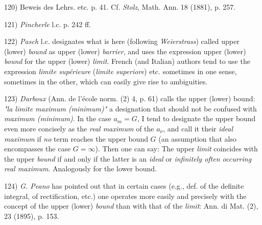 \vfill
\leftline{\rule{2in}{0.4pt}}
\vspace{0.2cm}
{
\footnotesize
120) Beweis des Lehrs. etc. p. 41. Cf. \textit{Stolz}, Math. Ann. 18 (1881), p. 257.

121) \textit{Pincherle} l.c. p. 242 ff.

122) \textit{Pasch} l.c. designates what is here (following \textit{Weierstrass}) called upper (lower) \textit{bound} as upper (lower) \textit{barrier}, and uses the expression upper (lower) \textit{bound} for the upper (lower) \textit{limit}. French (and Italian) authors tend to use the expression \textit{limite supérieure} (\textit{limite superiore}) etc. sometimes in one sense, sometimes in the other, which can easily give rise to ambiguities.

123) \textit{Darboux} (Ann. de l'école norm. (2) 4, p. 61) calls the upper (lower) bound: \textit{"la limite maximum (minimum)"} a designation that should not be confused with\textit{ maximum (minimum)}. In the case $a_m = G$, I tend to designate the upper bound even more concisely as the \textit{real maximum} of the $a_\nu$, and call it their \textit{ideal maximum} if \textit{no} term reaches the upper bound $G$ (an assumption that also encompasses the case $G = \infty$). Then one can say: The upper \textit{limit} coincides with the upper \textit{bound} if and only if the latter is an \textit{ideal} or \textit{infinitely often occurring real maximum}. Analogously for the lower bound.

124) \textit{G. Peano} has pointed out that in certain cases (e.g., def. of the definite integral, of rectification, etc.) one operates more easily and precisely with the concept of the upper (lower) \textit{bound} than with that of the \textit{limit}: Ann. di Mat. (2), 23 (1895), p. 153.

}